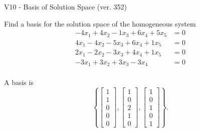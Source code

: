 \begin{exercise}
  \begin{exerciseTitle}V10 - Basis of Solution Space (ver. 352)\end{exerciseTitle}
  \begin{exerciseStatement}
    Find a basis for the solution space of the homogeneous system 
\begin{align*}
 -4 x_ 1 + 4 x_ 2 -1 x_ 3 + 6 x_ 4 + 5 x_ 5 &= 0  \\ 
  4 x_ 1 -4 x_ 2 -5 x_ 3 + 6 x_ 4 + 1 x_ 5 &= 0  \\ 
  2 x_ 1 -2 x_ 2 -3 x_ 3 + 4 x_ 4 + 1 x_ 5 &= 0  \\ 
  -3 x_ 1 + 3 x_ 2 + 3 x_ 3 -3 x_ 4 &= 0  \\ 
 \end{align*}


 
  \end{exerciseStatement}

  \begin{exerciseAnswer}
   A basis is   
\[\left\{\left[\begin{array}{c}
1 \\
1 \\
0 \\
0 \\
0
\end{array}\right] , \left[\begin{array}{c}
1 \\
0 \\
2 \\
1 \\
0
\end{array}\right] , \left[\begin{array}{c}
1 \\
0 \\
1 \\
0 \\
1
\end{array}\right]\right\}.\]

  


  \end{exerciseAnswer}
\end{exercise}